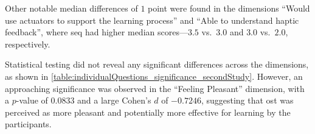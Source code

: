 Other notable median differences of $1$ point were found in the dimensions \enquote{Would use actuators to support the learning process} and \enquote{Able to understand haptic feedback}, where \gls{seq} had higher median scores—$3.5$ vs.\ $3.0$ and $3.0$ vs.\ $2.0$, respectively.

Statistical testing did not reveal any significant differences across the dimensions, as shown in \autoref{table:individualQuestions_significance_secondStudy}. However, an approaching significance was observed in the \enquote{Feeling Pleasant} dimension, with a $p$-value of $0.0833$ and a large Cohen's $d$ of $-0.7246$, suggesting that \gls{ost} was perceived as more pleasant and potentially more effective for learning by the participants.



\begin{table}[ht]
\caption{Results of the Wilcoxon significance tests for the different self-assessment dimensions with a Cohens D Effect Size.}
\label{table:individualQuestions_significance_secondStudy}
\end{table}



